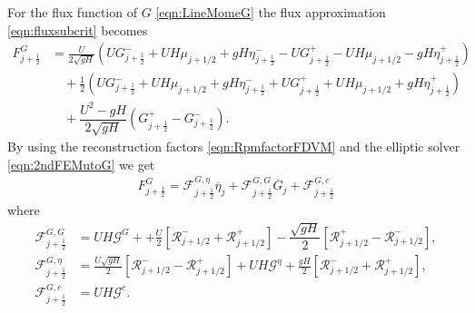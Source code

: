 For the flux function of $G$ \eqref{eqn:LineMomeG} the flux approximation \eqref{eqn:fluxsubcrit} becomes
\begin{align*}
F^G_{j+\frac{1}{2}} &= \frac{U}{2 \sqrt{gH}} \left(UG^-_{j+\frac{1}{2}} + UH \mu_{j+1/2} + gH\eta^-_{j+\frac{1}{2}} - UG^+_{j+\frac{1}{2}} - UH \mu_{j+1/2} - gH\eta^+_{j+\frac{1}{2}}  \right)   \nonumber \\ & \quad + \frac{1}{2}\left(UG^-_{j+\frac{1}{2}} + UH \mu_{j+1/2} + gH\eta^-_{j+\frac{1}{2}} + UG^+_{j+\frac{1}{2}} + UH \mu_{j+1/2} + gH\eta^+_{j+\frac{1}{2}}\right) \nonumber \\ & \quad+ \dfrac{U^2 - gH}{2\sqrt{g H}} \left ( G^+_{j+\frac{1}{2}} - G^-_{j+\frac{1}{2}} \right ).
\end{align*}
By using the reconstruction factors \eqref{eqn:RpmfactorFDVM} and the elliptic solver \eqref{eqn:2ndFEMutoG} we get
	\begin{align*}
	F^G_{j+\frac{1}{2}} = \mathcal{F}^{G, \eta}_{j+\frac{1}{2}} \overline{\eta}_{j} + \mathcal{F}^{G, G}_{j+\frac{1}{2}} \overline{G}_{j} + \mathcal{F}^{G, c}_{j+\frac{1}{2}}
	\end{align*}
	where
	\begin{align*}
	\mathcal{F}^{G, G}_{j+\frac{1}{2}} &=  UH\mathcal{G}^{G} + + \frac{U}{2} \left[ \mathcal{R}^-_{j+1/2} +\mathcal{R}^+_{j+1/2} \right] - \dfrac{\sqrt{g H}}{2} \left [\mathcal{R}^+_{j+1/2} - \mathcal{R}^-_{j+1/2} \right ],  \\
	\mathcal{F}^{G, \eta}_{j+\frac{1}{2}} &=  \frac{U\sqrt{gH}}{2} \left[ \mathcal{R}^-_{j+1/2} - \mathcal{R}^+_{j+1/2}  \right] + UH\mathcal{G}^{\eta} + \frac{gH}{2} \left[ \mathcal{R}^-_{j+1/2} +\mathcal{R}^+_{j+1/2} \right], \\
	\mathcal{F}^{G, c}_{j+\frac{1}{2}} &=  UH\mathcal{G}^c.
	\end{align*}


